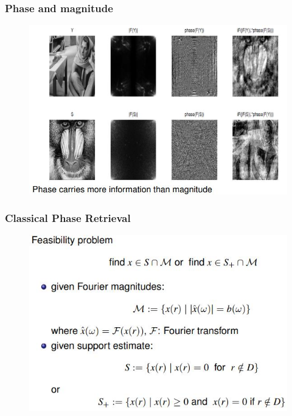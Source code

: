\documentclass[UTF8]{beamer}
\begin{document}
\begin{frame} \frametitle{Phase and magnitude}
\begin{figure}[H]
\centering

    \includegraphics[width=1\linewidth]{../figures0/Phaseandmagnitude.jpg}  
   
\end{figure}
\end{frame}





\begin{frame}[c]\frametitle{Classical Phase Retrieval}
\begin{figure}[H]
\centering

    \includegraphics[width=1\linewidth]{../figures0/ClassicalPhaze.jpg}  
   
\end{figure}

\end{frame}
\end{document}
